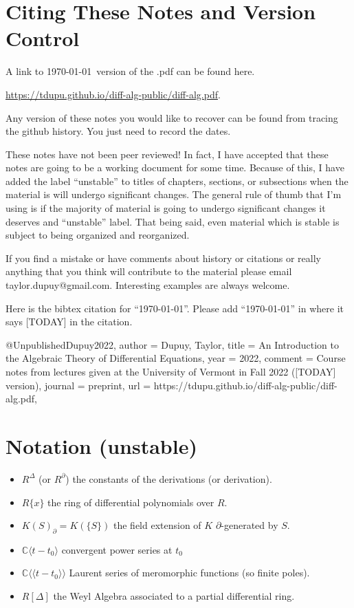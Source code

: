 \documentclass[12pt]{book}
\numberwithin{equation}{section}
\theoremstyle{definition}
\theoremstyle{remark}
\newcommand{\CC}{\mathbb{C}}
\newcommand{\llangle}{\langle \langle}
\newcommand{\rrangle}{\rangle \rangle}
\begin{document}
\fi


\section*{Citing These Notes and Version Control}
A link to \today \ version of the .pdf can be found here.
\begin{center}
	\url{https://tdupu.github.io/diff-alg-public/diff-alg.pdf}.
\end{center}
Any version of these notes you would like to recover can be found from tracing the github history. 
You just need to record the dates.

These notes have not been peer reviewed! In fact, I have accepted that these notes are going to be a working document for some time. 
Because of this, I have added the label ``unstable'' to titles of chapters, sections, or subsections when the material is will undergo significant changes.
The general rule of thumb that I'm using is if the majority of material is going to undergo significant changes it deserves and ``unstable'' label. 
That being said, even material which is stable is subject to being organized and reorganized. 

If you find a mistake or have comments about history or citations or really anything that you think will contribute to the material please email taylor.dupuy@gmail.com. Interesting examples are always welcome. 

Here is the bibtex citation for ``\today''. Please add ``\today'' in where it says [TODAY] in the citation. 
\begin{spverbatim}
@Unpublished{Dupuy2022,
author  = {Dupuy, Taylor},
title   = {An Introduction to the Algebraic Theory of Differential Equations},
year    = {2022},
comment = {Course notes from lectures given at the University of Vermont in Fall 2022 ([TODAY] version)},
journal = {preprint},
url     = {https://tdupu.github.io/diff-alg-public/diff-alg.pdf},
}
\end{spverbatim}



\newpage 
\section{Notation (unstable)}
\begin{itemize}
	\item $R^{\Delta}$ (or $R^{\partial}$) the constants of the derivations (or derivation). 
	\item $R\lbrace x \rbrace$ the ring of differential polynomials over $R$.
	\item $K(S)_{\partial} = K(\lbrace S \rbrace)$ the field extension of $K$ $\partial$-generated by $S$.
	\item $\CC\langle t-t_0 \rangle$ convergent power series at $t_0$
	\item $\CC\llangle t-t_0\rrangle$ Laurent series of meromorphic functions (so finite poles).
	\item $R[\Delta]$ the Weyl Algebra associated to a partial differential ring.
\end{itemize}
\newpage
\end{document}
